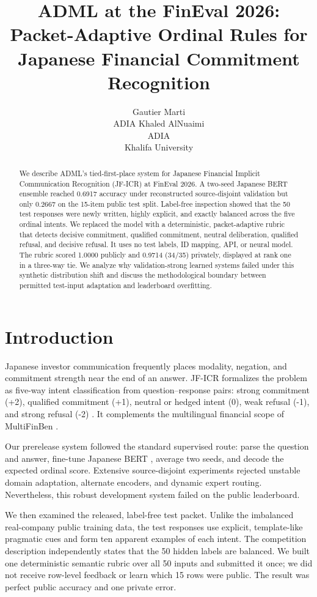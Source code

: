 \documentclass[11pt]{article}
\title{ADML at the FinEval 2026: Packet-Adaptive Ordinal Rules for Japanese Financial Commitment Recognition}
\author{Gautier Marti \\
  ADIA
  \And
  Khaled AlNuaimi \\
  ADIA \\
  Khalifa University}
\begin{document}
\maketitle

\begin{abstract}
We describe ADML's tied-first-place system for Japanese Financial Implicit Communication Recognition (JF-ICR) at FinEval 2026. A two-seed Japanese BERT ensemble reached 0.6917 accuracy under reconstructed source-disjoint validation but only 0.2667 on the 15-item public test split. Label-free inspection showed that the 50 test responses were newly written, highly explicit, and exactly balanced across the five ordinal intents. We replaced the model with a deterministic, packet-adaptive rubric that detects decisive commitment, qualified commitment, neutral deliberation, qualified refusal, and decisive refusal. It uses no test labels, ID mapping, API, or neural model. The rubric scored 1.0000 publicly and 0.9714 (34/35) privately, displayed at rank one in a three-way tie. We analyze why validation-strong learned systems failed under this synthetic distribution shift and discuss the methodological boundary between permitted test-input adaptation and leaderboard overfitting.
\end{abstract}

\section{Introduction}
Japanese investor communication frequently places modality, negation, and commitment strength near the end of an answer. JF-ICR formalizes the problem as five-way intent classification from question--response pairs: strong commitment (+2), qualified commitment (+1), neutral or hedged intent (0), weak refusal (-1), and strong refusal (-2) \citep{peng-etal-2026-ebisu}. It complements the multilingual financial scope of MultiFinBen \citep{peng-etal-2026-multifinben}.

Our prerelease system followed the standard supervised route: parse the question and answer, fine-tune Japanese BERT \citep{devlin-etal-2019-bert}, average two seeds, and decode the expected ordinal score. Extensive source-disjoint experiments rejected unstable domain adaptation, alternate encoders, and dynamic expert routing. Nevertheless, this robust development system failed on the public leaderboard.

We then examined the released, label-free test packet. Unlike the imbalanced real-company public training data, the test responses use explicit, template-like pragmatic cues and form ten apparent examples of each intent. The competition description independently states that the 50 hidden labels are balanced. We built one deterministic semantic rubric over all 50 inputs and submitted it once; we did not receive row-level feedback or learn which 15 rows were public. The result was perfect public accuracy and one private error.
\end{document}

